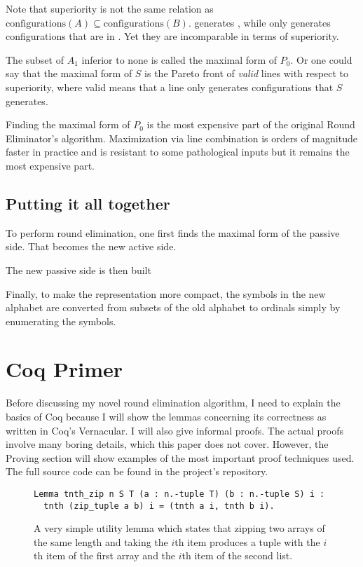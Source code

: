\documentclass[english, 12pt, a4paper, sci, utf8, a-1b, online]{aaltothesis}
\begin{document}
Note that superiority is not the same relation as $\text{configurations}(A) \subseteq \text{configurations}(B)$.  generates , while  only generates configurations that are in . Yet they are incomparable in terms of superiority.

The subset of $A_{1}$ inferior to none is called the maximal form of $P_{0}$. Or one could say that the maximal form of $S$ is the Pareto front of \emph{valid} lines with respect to superiority, where valid means that a line only generates configurations that $S$ generates.

Finding the maximal form of $P_{0}$ is the most expensive part of the original Round Eliminator's algorithm. Maximization via line combination is orders of magnitude faster in practice and is resistant to some pathological inputs but it remains the most expensive part. %


\subsection{Putting it all together}

To perform round elimination, one first finds the maximal form of the passive side. That becomes the new active side.

The new passive side is then built %

Finally, to make the representation more compact, the symbols in the new alphabet are converted from subsets of the old alphabet to ordinals simply by enumerating the symbols.

\section{Coq Primer}

Before discussing my novel round elimination algorithm, I need to explain the basics of Coq because I will show the lemmas concerning its correctness as written in Coq's Vernacular. I will also give informal proofs. The actual proofs involve many boring details, which this paper does not cover. However, the Proving section will show examples of the most important proof techniques used. The full source code can be found in the project's repository\cite{source_code}.

\begin{figure}[h]
\begin{verbatim}
Lemma tnth_zip n S T (a : n.-tuple T) (b : n.-tuple S) i :
  tnth (zip_tuple a b) i = (tnth a i, tnth b i).
\end{verbatim}
\caption{A very simple utility lemma which states that zipping two arrays of the same length and taking the $i$th item produces a tuple with the $i$th item of the first array and the $i$th item of the second list.}
\end{figure}
\end{document}
